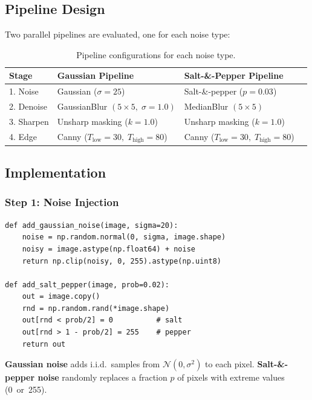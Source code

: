 \documentclass[12pt,a4paper]{article}
\begin{document}
\subsection{Pipeline Design}

Two parallel pipelines are evaluated, one for each noise type:

\begin{table}[H]
  \centering
  \begin{tabular}{@{}llll@{}}
    \toprule
    \textbf{Stage} & \textbf{Gaussian Pipeline} & \textbf{Salt-\&-Pepper Pipeline} \\
    \midrule
    1. Noise & Gaussian ($\sigma=25$) & Salt-\&-pepper ($p=0.03$) \\
    2. Denoise & GaussianBlur $(5\times5,\;\sigma=1.0)$ & MedianBlur $(5\times5)$ \\
    3. Sharpen & Unsharp masking ($k=1.0$) & Unsharp masking ($k=1.0$) \\
    4. Edge & Canny ($T_\text{low}=30,\;T_\text{high}=80$) & Canny ($T_\text{low}=30,\;T_\text{high}=80$) \\
    \bottomrule
  \end{tabular}
  \caption{Pipeline configurations for each noise type.}
  \label{tab:pipeline}
\end{table}

\subsection{Implementation}

\subsubsection*{Step 1: Noise Injection}

\begin{lstlisting}
def add_gaussian_noise(image, sigma=20):
    noise = np.random.normal(0, sigma, image.shape)
    noisy = image.astype(np.float64) + noise
    return np.clip(noisy, 0, 255).astype(np.uint8)

def add_salt_pepper(image, prob=0.02):
    out = image.copy()
    rnd = np.random.rand(*image.shape)
    out[rnd < prob/2] = 0          # salt
    out[rnd > 1 - prob/2] = 255    # pepper
    return out
\end{lstlisting}

\textbf{Gaussian noise} adds i.i.d.\ samples from $\mathcal{N}(0, \sigma^2)$ to each pixel. \textbf{Salt-\&-pepper noise} randomly replaces a fraction $p$ of pixels with extreme values (0~or~255).
\end{document}
